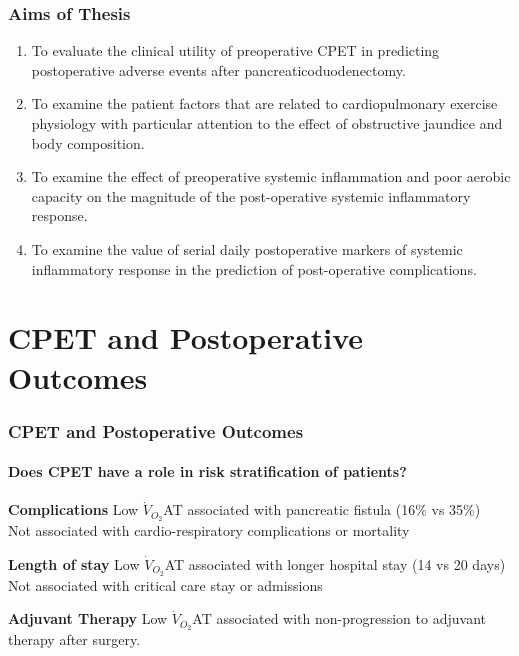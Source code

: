 \documentclass[10pt]{beamer}
\begin{document}
\begin{frame}
	\frametitle{Aims of Thesis}
	\begin{enumerate}
		\item To evaluate the clinical utility of preoperative CPET in predicting postoperative adverse events after pancreaticoduodenectomy.
\pause
		\item To examine the patient factors that are related to cardiopulmonary exercise physiology with particular attention to the effect of obstructive jaundice and body composition.
\pause
		\item To examine the effect of preoperative systemic inflammation and poor aerobic capacity on the magnitude of the post-operative systemic inflammatory response.
\pause
		\item To examine the value of serial daily postoperative markers of systemic inflammatory response in the prediction of post-operative complications.
	\end{enumerate}
\end{frame}



\section[Chapter 2]{CPET and Postoperative Outcomes}
\begin{frame}
	\frametitle{CPET and Postoperative Outcomes}
	\framesubtitle{Does CPET have a role in risk stratification of patients?}
	\begin{block}{\textbf{Complications}}
		Low $\dot{V}_{O_2}$AT associated with pancreatic fistula (16\% vs 35\%) \\
		Not associated with cardio-respiratory complications or mortality
	\end{block}
\pause	
	\begin{block}{\textbf{Length of stay}}
		Low $\dot{V}_{O_2}$AT associated with longer hospital stay (14 vs 20 days)\\
		Not associated with critical care stay or admissions
	\end{block}
\pause	
	\begin{block}{\textbf{Adjuvant Therapy}}
		Low $\dot{V}_{O_2}$AT associated with non-progression to adjuvant therapy after surgery.
	\end{block}
\end{frame}
\end{document}
